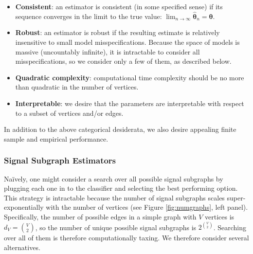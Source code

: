 \documentclass[10pt,journal,cspaper,compsoc]{IEEEtran}
\providecommand{\ve}[1]{\boldsymbol{#1}}
\newcommand{\bth}{\ve{\theta}}
\newcommand{\bhth}{\mh{\ve{\theta}}}
\providecommand{\mc}[1]{\mathcal{#1}}
\providecommand{\mh}[1]{\hat{#1}}
\newcommand{\conv}{\rightarrow}
\begin{document}
\begin{itemize}
	\item \textbf{Consistent}: an estimator is consistent (in some specified sense) if its sequence converges in the limit to the true value: $\lim_{n \conv \infty} \bhth_n = \bth$.  %
	\item \textbf{Robust}: an estimator is robust if the resulting estimate is relatively insensitive to small model misspecifications.  Because the space of models is massive (uncountably infinite), it is intractable to consider all misspecifications, so we consider only a few of them, as described below.
	\item \textbf{Quadratic complexity}: computational time complexity should be no more than quadratic in the number of vertices.
	\item \textbf{Interpretable}: we desire that the parameters are interpretable with respect to a subset of vertices and/or edges.
\end{itemize}
In addition to the above categorical desiderata, we also desire appealing finite sample and empirical performance.


\subsubsection{Signal Subgraph Estimators} %
\label{ssub:subsubsection_name1}


Na\"{i}vely, one might consider a search over all possible signal subgraphs by plugging each one in to the classifier and selecting the best performing option.  This strategy is intractable because the number of signal subgraphs scales super-exponentially with the number of vertices (see Figure \ref{fig:numgraphs}, left panel). Specifically, the number of possible edges in a simple graph with $V$ vertices is $d_V=\binom{V}{2}$, so the number of unique possible signal subgraphs is $2^{\binom{V}{2}}$.  Searching over all of them is therefore computationally taxing. %
We therefore consider several alternatives.
\end{document}

